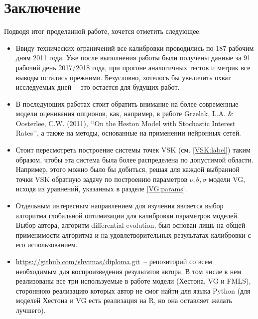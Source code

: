 \documentclass[oneside, final, 12pt, a4paper]{article}
\begin{document}
\section{Заключение}
Подводя итог проделанной работе, хочется отметить следующее:
\begin{itemize}
\item Ввиду технических ограничений все калибровки проводились по 187 рабочим дням 2011 года. Уже после выполнения работы были получены данные за 91 рабочий день 2017/2018 года, при прогоне аналогичных тестов и метрик все выводы остались прежними. Безусловно, хотелось бы увеличить охват исследуемых дней~-- это остается для будущих работ.
\item В последующих работах стоит обратить внимание на более современные модели оценивания опционов, как, например, в работе Grzelak, L.A. \& Oosterlee, C.W. (2011), \lq\lq{}On the Heston Model with Stochastic Interest Rates\rq\rq{}, а также на методы, основанные на применении нейронных сетей.
\item Стоит пересмотреть построение системы точек VSK (см. \ref{VSK:label}) таким образом, чтобы эта система была более распределена по допустимой области. Например, этого можно было бы добиться, решая для каждой выбранной точки VSK обратную задачу по построению параметров \( \nu, \theta, \sigma \) модели VG, исходя из уравнений, указанных в разделе \ref{VG:params}.
\item Отдельным интересным направлением для изучения является выбор алгоритма глобальной оптимизации для калибровки параметров моделей. Выбор автора, алгоритм differential evolution\cite{DE:paper1}, был основан лишь на общей применимости алгоритма и на удовлетворительных результатах калибровки с его использованием.
\item \url{https://github.com/shvimas/diploma.git}~-- репозиторий со всем необходимым для воспроизведения результатов автора. В том числе в нем реализованы все три используемые в работе модели (Хестона, VG и FMLS), стороннюю реализацию которых автор не смог найти для языка Python (для моделей Хестона и VG есть реализация на R, но она оставляет желать лучшего).
\end{itemize}
\end{document}
